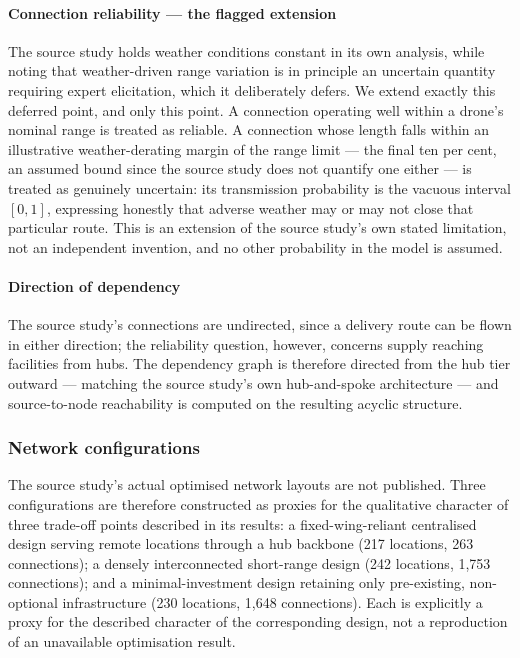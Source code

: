 \documentclass[preprint,12pt]{elsarticle}
\theoremstyle{definition}
\begin{document}
\paragraph{Connection reliability --- the flagged extension} The source study holds weather conditions
constant in its own analysis, while noting that weather-driven range variation is in principle an
uncertain quantity requiring expert elicitation, which it deliberately defers. We extend exactly this
deferred point, and only this point. A connection operating well within a drone's nominal range is
treated as reliable. A connection whose length falls within an illustrative weather-derating margin of
the range limit --- the final ten per cent, an assumed bound since the source study does not quantify
one either --- is treated as genuinely uncertain: its transmission probability is the vacuous interval
$[0,1]$, expressing honestly that adverse weather may or may not close that particular route. This is an
extension of the source study's own stated limitation, not an independent invention, and no other
probability in the model is assumed.

\paragraph{Direction of dependency} The source study's connections are undirected, since a delivery
route can be flown in either direction; the reliability question, however, concerns supply reaching
facilities from hubs. The dependency graph is therefore directed from the hub tier outward --- matching
the source study's own hub-and-spoke architecture --- and source-to-node reachability is computed on the
resulting acyclic structure.

\subsubsection{Network configurations}\label{sec:configs}

The source study's actual optimised network layouts are not published. Three configurations are
therefore constructed as proxies for the qualitative character of three trade-off points described in
its results: a fixed-wing-reliant centralised design serving remote locations through a hub backbone
(217 locations, 263 connections); a densely interconnected short-range design (242 locations, 1{,}753
connections); and a minimal-investment design retaining only pre-existing, non-optional infrastructure
(230 locations, 1{,}648 connections). Each is explicitly a proxy for the described character of the
corresponding design, not a reproduction of an unavailable optimisation result.
\end{document}
